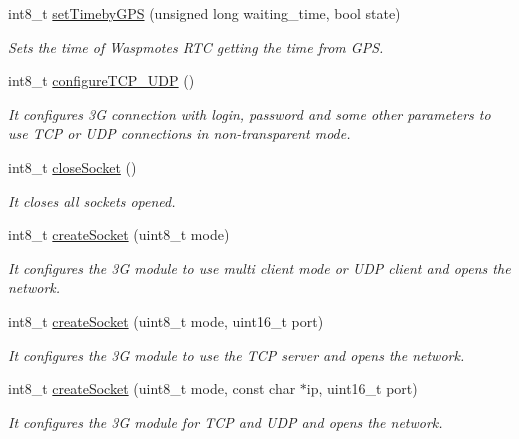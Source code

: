 \begin{DoxyCompactItemize}
\item 
int8\+\_\+t \hyperlink{class_wasp3_g_a6ed5d8326b4388d7c0e76e44288daf63}{set\+Timeby\+G\+PS} (unsigned long waiting\+\_\+time, bool state)
\begin{DoxyCompactList}\small\item\em Sets the time of Waspmote\textquotesingle{}s R\+TC getting the time from G\+PS. \end{DoxyCompactList}\item 
int8\+\_\+t \hyperlink{class_wasp3_g_ab27d7ce20eb60cdfce78b743d135b726}{configure\+T\+C\+P\+\_\+\+U\+DP} ()
\begin{DoxyCompactList}\small\item\em It configures 3G connection with login, password and some other parameters to use T\+CP or U\+DP connections in non-\/transparent mode. \end{DoxyCompactList}\item 
int8\+\_\+t \hyperlink{class_wasp3_g_a7af43ae29b04349ccfbe907cbd49b32a}{close\+Socket} ()
\begin{DoxyCompactList}\small\item\em It closes all sockets opened. \end{DoxyCompactList}\item 
int8\+\_\+t \hyperlink{class_wasp3_g_abb4b2ef2c0123d89b4408029c80c52a5}{create\+Socket} (uint8\+\_\+t mode)
\begin{DoxyCompactList}\small\item\em It configures the 3G module to use multi client mode or U\+DP client and opens the network. \end{DoxyCompactList}\item 
int8\+\_\+t \hyperlink{class_wasp3_g_a3648ce4792de6193dce79c45a90fa28d}{create\+Socket} (uint8\+\_\+t mode, uint16\+\_\+t port)
\begin{DoxyCompactList}\small\item\em It configures the 3G module to use the T\+CP server and opens the network. \end{DoxyCompactList}\item 
int8\+\_\+t \hyperlink{class_wasp3_g_a3744b0a3e5073094bcc257ceb037bd42}{create\+Socket} (uint8\+\_\+t mode, const char $\ast$ip, uint16\+\_\+t port)
\begin{DoxyCompactList}\small\item\em It configures the 3G module for T\+CP and U\+DP and opens the network. \end{DoxyCompactList}\item 

\end{DoxyCompactItemize}
